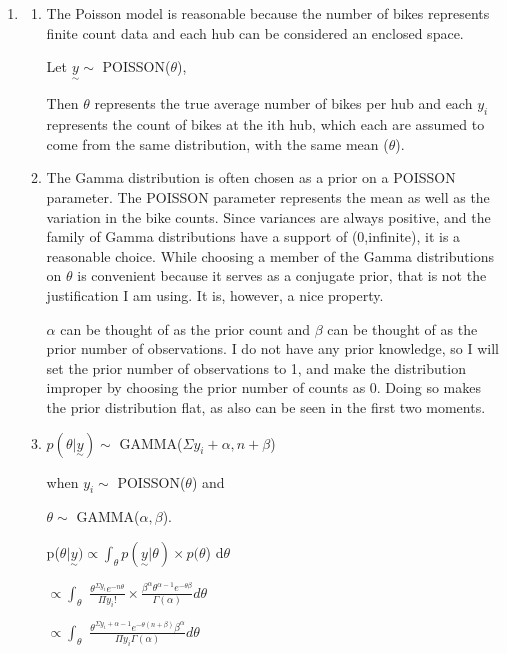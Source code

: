 \documentclass{article}\usepackage[]{graphicx}\usepackage[]{color}
\begin{document}
\begin{enumerate}
\addtocounter{enumi}{1}
\item%

\begin{enumerate}
\item%
The Poisson model is reasonable because the number of bikes represents finite count data and each hub can  be considered an enclosed space. 

Let $\underset{\sim}{y} \sim$ POISSON($\theta$),

Then $\theta$ represents the true average number of bikes per hub and each $y_{i}$ represents the count of bikes at the ith hub, which each are assumed to come from the same distribution, with the same mean ($\theta$).

\item%
The Gamma distribution is often chosen as a prior on a POISSON parameter. The POISSON parameter represents the mean as well as the variation in the bike counts. Since variances are always positive, and the family of Gamma distributions have a support of (0,infinite), it is a reasonable choice. While choosing a member of the Gamma distributions on $\theta$ is convenient because it serves as a conjugate prior, that is not the justification I am using. It is, however, a nice property.

$\alpha$ can be thought of as the prior count and $\beta$ can be thought of as the prior number of observations. I do not have any prior knowledge, so I will set the prior number of observations to 1, and make the distribution improper by choosing the prior number of counts as 0. Doing so makes the prior distribution flat, as also can be seen in the first two moments.

\item%

$p(\theta | \underset{\sim}{y}) \sim$ GAMMA($\Sigma y_{i} + \alpha, n + \beta$)

when $y_{i} \sim$ POISSON($\theta$) and

$\theta \sim$ GAMMA($\alpha,\beta$).

p($\theta | \underset{\sim}{y}) \propto \int_{\theta} p(\underset{\sim}{y} | \theta) \times p(\theta$) d$\theta$

$\propto \int_{\theta}$ $\frac{\theta^{\Sigma y_{i}}e^{-n\theta}}{\Pi y_{i}!} \times \frac{\beta^{\alpha}\theta^{\alpha - 1}e^{-\theta\beta}}{\Gamma(\alpha)} d\theta$

$\propto \int_{\theta}$ $\frac{\theta^{\Sigma y_{i} + \alpha - 1}e^{-\theta(n+\beta)}\beta^{\alpha}}{\Pi y_{i}\Gamma(\alpha)} d\theta$


\end{enumerate}
\end{enumerate}
\end{document}
